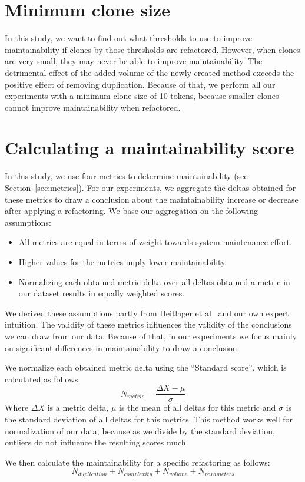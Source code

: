 \section{Minimum clone size}
In this study, we want to find out what thresholds to use to improve maintainability if clones by those thresholds are refactored. However, when clones are very small, they may never be able to improve maintainability. The detrimental effect of the added volume of the newly created method exceeds the positive effect of removing duplication. Because of that, we perform all our experiments with a minimum clone size of 10 tokens, because smaller clones cannot improve maintainability when refactored.

\section{Calculating a maintainability score}\label{sec:metricformula}
In this study, we use four metrics to determine maintainability (see Section~\ref{sec:metrics}). For our experiments, we aggregate the deltas obtained for these metrics to draw a conclusion about the maintainability increase or decrease after applying a refactoring. We base our aggregation on the following assumptions:
\begin{itemize}
  \item All metrics are equal in terms of weight towards system maintenance effort.
  \item Higher values for the metrics imply lower maintainability.
  \item Normalizing each obtained metric delta over all deltas obtained a metric in our dataset results in equally weighted scores.
\end{itemize}
We derived these assumptions partly from Heitlager et al~\cite{heitlager2007practical} and our own expert intuition. The validity of these metrics influences the validity of the conclusions we can draw from our data. Because of that, in our experiments we focus mainly on significant differences in maintainability to draw a conclusion.

We normalize each obtained metric delta using the ``Standard score'', which is calculated as follows:
\begin{equation}\label{eq:scoredev}
N_{metric} = \frac {\Delta X-\mu}{\sigma}
\end{equation}
Where $\Delta X$ is a metric delta, $\mu$ is the mean of all deltas for this metric and $\sigma$ is the standard deviation of all deltas for this metrics. This method works well for normalization of our data, because as we divide by the standard deviation, outliers do not influence the resulting scores much.

We then calculate the maintainability for a specific refactoring as follows:
\begin{equation}\label{eq:scoreref}
N_{duplication} + N_{complexity} + N_{volume} + N_{parameters}
\end{equation}
